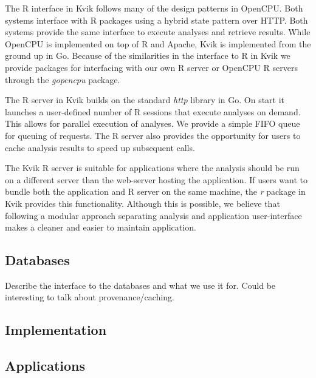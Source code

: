 The R interface in Kvik follows many of the design patterns in OpenCPU. Both
systems interface with R packages using a hybrid state pattern over HTTP. Both
systems provide the same interface to execute analyses and retrieve results.
While OpenCPU is implemented on top of R and Apache, Kvik is implemented from
the ground up in Go. Because of the similarities in the interface to R in Kvik
we provide packages for interfacing with our own R server or OpenCPU R servers
through the \emph{gopencpu} package. 

The R server in Kvik builds on the standard \emph{http} library in Go. On start
it launches a user-defined number of R sessions that execute analyses on demand.
This allows for parallel execution of analyses. We provide a simple FIFO queue
for queuing of requests. The R server also provides the opportunity for users to
cache analysis results to speed up subsequent calls. 

The Kvik R server is suitable for applications where the analysis should be run
on a different server than the web-server hosting the application. If users want
to bundle both the application and R server on the same machine, the \emph{r}
package in Kvik provides this functionality. Although this is possible, we
believe that following a modular approach separating analysis and
application user-interface makes a cleaner and easier to maintain application. 

\subsection*{Databases}
Describe the interface to the databases and what we use it for. Could be
interesting to talk about provenance/caching.

\subsection*{Implementation}

\subsection*{Applications}





